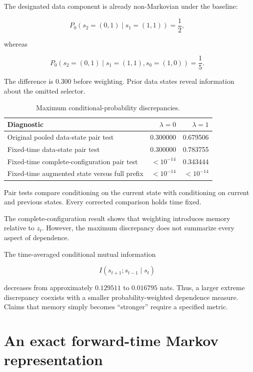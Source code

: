 \documentclass[11pt]{article}
\theoremstyle{remark}
\begin{document}
The designated data component is already non-Markovian under the baseline:

\begin{equation}
P_0(s_2=(0,1)\mid s_1=(1,1))
=
\frac12,
\end{equation}

whereas

\begin{equation}
P_0(s_2=(0,1)\mid s_1=(1,1),s_0=(1,0))
=
\frac15.
\end{equation}

The difference is \(0.300\) before weighting. Prior data states reveal information about the omitted selector.

\begin{table}[htbp]
\centering
\caption{Maximum conditional-probability discrepancies.}
\label{tab:memory}
\begin{tabular}{@{}p{}rr@{}}
\toprule
Diagnostic & \(\lambda=0\) & \(\lambda=1\) \\
\midrule
Original pooled data-state pair test & 0.300000 & 0.679506 \\
Fixed-time data-state pair test & 0.300000 & 0.783755 \\
Fixed-time complete-configuration pair test & \(<10^{-14}\) & 0.343444 \\
Fixed-time augmented state versus full prefix & \(<10^{-14}\) & \(<10^{-14}\) \\
\bottomrule
\end{tabular}
\end{table}

Pair tests compare conditioning on the current state with conditioning on current and previous states. Every corrected comparison holds time fixed.

The complete-configuration result shows that weighting introduces memory relative to \(z_t\). However, the maximum discrepancy does not summarize every aspect of dependence.

The time-averaged conditional mutual information

\begin{equation}
I(s_{t+1};s_{t-1}\mid s_t)
\end{equation}

decreases from approximately \(0.129511\) to \(0.016795\) nats. Thus, a larger extreme discrepancy coexists with a smaller probability-weighted dependence measure. Claims that memory simply becomes ``stronger'' require a specified metric.

\section{An exact forward-time Markov representation}
\end{document}

